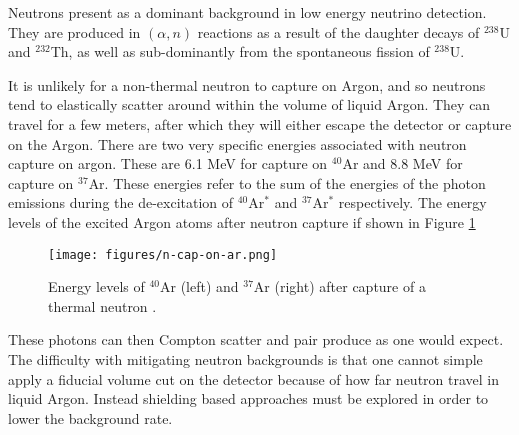 Neutrons present as a dominant background in low energy neutrino detection.
They are produced in $(\alpha, n)$ reactions as a result of the daughter decays of $^{238}$U and $^{232}$Th, as well as sub-dominantly from the spontaneous fission of $^{238}$U.

It is unlikely for a non-thermal neutron to capture on Argon, and so neutrons tend to elastically scatter around within the volume of liquid Argon.  
They can travel for a few meters, after which they will either escape the detector or capture on the Argon.
There are two very specific energies associated with neutron capture on argon.
These are 6.1 MeV for capture on $^{40}$Ar and 8.8 MeV for capture on $^{37}$Ar.
These energies refer to the sum of the energies of the photon emissions during the de-excitation of $^{40}$Ar$^{*}$ and $^{37}$Ar$^{*}$ respectively.
The energy levels of the excited Argon atoms after neutron capture if shown in Figure \ref{fig:neutron-gamma}

\begin{figure}[h] %
   \centering
   \texttt{[image: figures/n-cap-on-ar.png]} 
   \caption{Energy levels of $^{40}$Ar (left) and $^{37}$Ar (right) after capture of a thermal neutron \cite{hardell1970thermal}.}
   \label{fig:neutron-gamma}
\end{figure}

\noindent These photons can then Compton scatter and pair produce as one would expect. 
The difficulty with mitigating neutron backgrounds is that one cannot simple apply a fiducial volume cut on the detector because of how far neutron travel in liquid Argon.
Instead shielding based approaches must be explored in order to lower the background rate.














